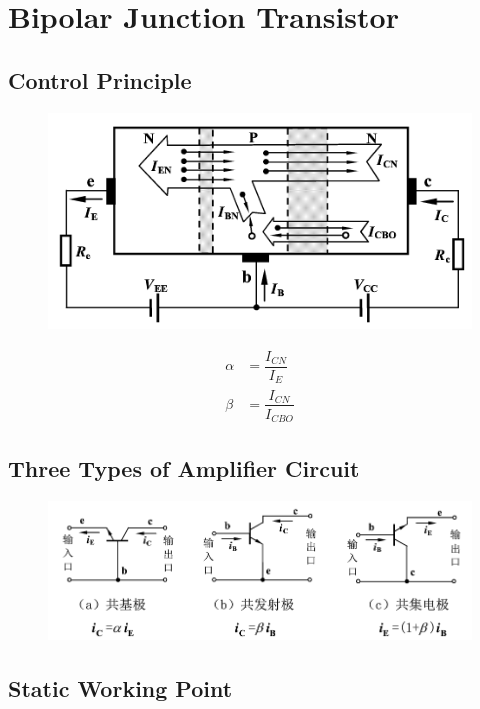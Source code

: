 \chapter{Bipolar Junction Transistor}

\section{Control Principle}

\begin{figure}[H]
  \centering
  \includegraphics[width=0.5\linewidth]{figures/BJT-control-principle}
  \label{fig:}
\end{figure}

\begin{equation*}
  \begin{aligned}
    \alpha &= \dfrac{I_{CN}}{I_E} \\
    \beta &= \dfrac{I_{CN}}{I_{CBO}} 
  \end{aligned}
\end{equation*}

\section{Three Types of Amplifier Circuit}

\begin{figure}[H]
  \centering
  \includegraphics[width=0.9\linewidth]{figures/BJT-three-types}
  \label{fig:}
\end{figure}

\section{Static Working Point}

